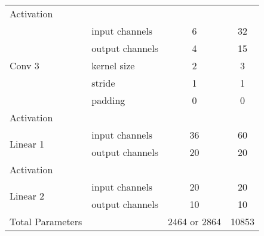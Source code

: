 \begin{table}[h!]
\begin{minipage}{0.8\textwidth}
{\begin{tabular}{@{}llcc@{}}
        \cmidrule(r){1-1} \cmidrule(rl){2-2}  \cmidrule(rl){3-3}  \cmidrule(rl){4-4}
        Activation              &          &             &          \\
        \cmidrule(r){1-1} \cmidrule(rl){2-2}  \cmidrule(rl){3-3}  \cmidrule(rl){4-4}
        \multirow{5}{*}{Conv 3} & input channels     & 6            & 32        \\
                                & output channels    & 4            & 15        \\
                                & kernel size        & 2            & 3        \\
                                & stride             & 1            & 1        \\
                                & padding            & 0            & 0       \\
        \cmidrule(r){1-1} \cmidrule(rl){2-2}  \cmidrule(rl){3-3}  \cmidrule(rl){4-4}
        Activation              &          &                      \\
        \cmidrule(r){1-1} \cmidrule(rl){2-2}  \cmidrule(rl){3-3}  \cmidrule(rl){4-4}
        \multirow{2}{*}{Linear 1} & input channels     & 36         & 60          \\
                                & output channels    & 20           & 20        \\
        \cmidrule(r){1-1} \cmidrule(rl){2-2}  \cmidrule(rl){3-3}  \cmidrule(rl){4-4}
        Activation              &          &                      \\
        \cmidrule(r){1-1} \cmidrule(rl){2-2}  \cmidrule(rl){3-3}  \cmidrule(rl){4-4}
        \multirow{2}{*}{Linear 2} & input channels     & 20         & 20          \\
                                & output channels    & 10           & 10        \\
        \midrule
        Total Parameters        &                   & 2464 or 2864     & 10853 \\
        \bottomrule
    \end{tabular}
    }
    \end{minipage}

\end{table}


